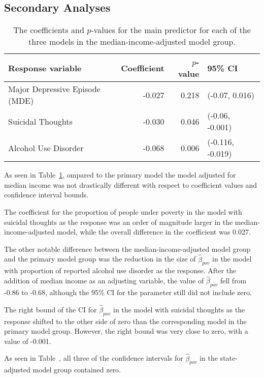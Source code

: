\documentclass{article}
\begin{document}
\subsection{Secondary Analyses}

\begin{table}[t]
\begin{center}
\begin{tabular}{l r r l}
    \toprule
    Response variable & Coefficient & $p$-value & 95\% CI\\
    \midrule
    Major Depressive Episode (MDE) & -0.027 & 0.218 & (-0.07, 0.016)\\
    Suicidal Thoughts & -0.030 & 0.046 & (-0.06, -0.001)\\
    Alcohol Use Disorder & -0.068 & 0.006 & (-0.116, -0.019)\\
    \bottomrule
\end{tabular}
\caption{\label{tab:median-income-model-results} The coefficients and $p$-values
    for the main predictor for each of the three models
    in the median-income-adjusted model group.
}
\end{center}
\end{table}

As seen in Table~\ref{tab:median-income-model-results},
ompared to the primary model the model adjusted for median income
was not drastically different with respect to coefficient values and
confidence interval bounds.

The coefficient for the proportion of people under
poverty in the model with suicidal thoughts as the response
was an order of magnitude larger in the median-income-adjusted model,
while the overall difference in the coefficient was 0.027.

The other notable difference between
the median-income-adjusted model group and the
primary model group was the reduction in the
size of $\hat{\beta}_{pov}$ in the model with
proportion of reported alcohol use disorder as the response.
After the addition of median income as an adjusting variable,
the value of $\hat{\beta}_{pov}$ fell from -0.86 to -0.68,
although the 95\% CI for the parameter still did not include zero.

The right bound of the CI for $\hat{\beta}_{pov}$ in the
model with suicidal thoughts as the response
shifted to the other side of zero than the corresponding model
in the primary model group.
However, the right bound was very close to zero,
with a value of -0.001.

As seen in Table~\label{tab:state-ind-model-results},
all three of the confidence intervals for
$\hat{\beta}_{pov}$ in the state-adjusted model group contained zero.
\end{document}
